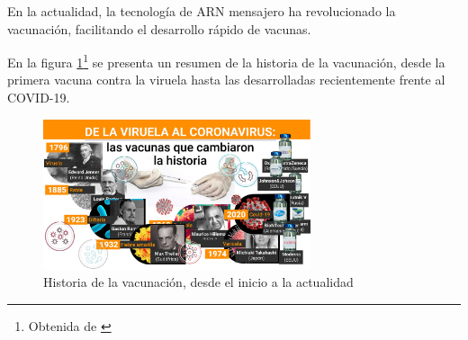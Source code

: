En la actualidad, la tecnología de ARN mensajero ha revolucionado la vacunación, facilitando el desarrollo rápido de vacunas.

En la figura \ref{fig:vacunación}\footnote{Obtenida de \cite{infobae2021vacunas}} se presenta un resumen de la historia de la vacunación, desde la primera vacuna contra la viruela hasta las desarrolladas recientemente frente al COVID-19.

    \begin{figure}[H]
        \centering
        \includegraphics[width=0.7\textwidth]{img/vacunación.jpg}
        \caption{Historia de la vacunación, desde el inicio a la actualidad}
        \label{fig:vacunación}
        \vspace{0.5cm} %
    \end{figure}



